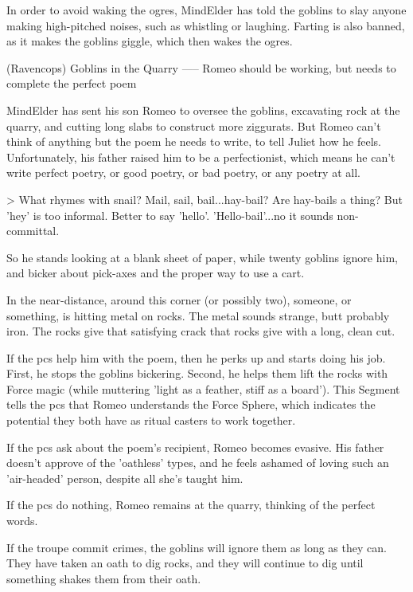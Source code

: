 In order to avoid waking the ogres, MindElder has told the goblins to slay anyone making high-pitched noises, such as whistling or laughing.
Farting is also banned, as it makes the goblins giggle, which then wakes the ogres.

(Ravencops) Goblins in the Quarry
-----
{Romeo should be working, but needs to complete the perfect poem}

MindElder has sent his son Romeo to oversee the goblins, excavating rock at the quarry, and cutting long slabs to construct more ziggurats.
But Romeo can't think of anything but the poem he needs to write, to tell Juliet how he feels.
Unfortunately, his father raised him to be a perfectionist, which means he can't write perfect poetry, or good poetry, or bad poetry, or any poetry at all.

> What rhymes with snail?  Mail, sail, bail...hay-bail?  Are hay-bails a thing?  But 'hey' is too informal.  Better to say 'hello'.  'Hello-bail'...no it sounds non-committal.

So he stands looking at a blank sheet of paper, while twenty goblins ignore him, and bicker about pick-axes and the proper way to use a cart.

\begin{boxtext}
  In the near-distance, around this corner (or possibly two), someone, or something, is hitting metal on rocks.
  The metal sounds strange, butt probably iron.
  The rocks give that satisfying crack that rocks give with a long, clean cut.
\end{boxtext}

If the \glspl{pc} help him with the poem,
then he perks up and starts doing his job.
First, he stops the goblins bickering.
Second, he helps them lift the rocks with Force magic (while muttering 'light as a feather, stiff as a board').
This Segment tells the \glspl{pc} that Romeo understands the Force Sphere, which indicates the potential they both have as ritual casters to work together.

If the \glspl{pc} ask about the poem's recipient,
Romeo becomes evasive.
His father doesn't approve of the 'oathless' types, and he feels ashamed of loving such an 'air-headed' person, despite all she's taught him.

If the \glspl{pc} do nothing,
Romeo remains at the quarry, thinking of the perfect words.

If the troupe commit crimes,
the goblins will ignore them as long as they can.
They have taken an oath to dig rocks, and they will continue to dig until something shakes them from their oath.

